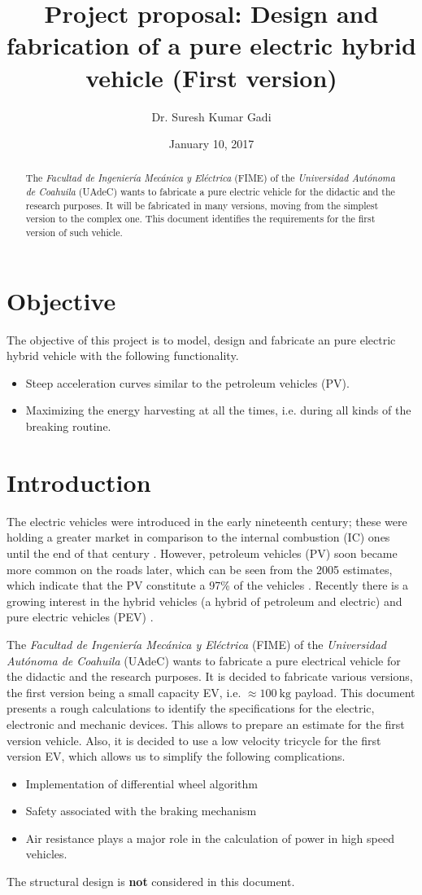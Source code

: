 \documentclass[journal]{IEEEtran}
\title{Project proposal: Design and fabrication of a pure electric hybrid vehicle (First version)}
\date {January 10, 2017}
\author{Dr. Suresh Kumar Gadi}
\begin{document}
\maketitle
\begin {abstract}
The \emph{Facultad de Ingeniería Mecánica y Eléctrica} (FIME) of the \emph{Universidad Autónoma de Coahuila} (UAdeC) wants to fabricate a pure electric vehicle for the didactic and the research purposes. It will be fabricated in many versions, moving from the simplest version to the complex one. This document identifies the requirements for the first version of such vehicle.
\end {abstract}
\section{Objective}
The objective of this project is to model, design and fabricate an pure electric hybrid vehicle with the following functionality.
\begin{itemize}
	\item Steep acceleration curves similar to the petroleum vehicles (PV).
	\item Maximizing the energy harvesting at all the times, i.e. during all kinds of the breaking routine.
\end{itemize}
\section{Introduction}
The electric vehicles were introduced in the early nineteenth century; these were holding a greater market in comparison to the internal combustion (IC) ones until the end of that century \cite{6487583}. However, petroleum vehicles (PV) soon became more common on the roads later, which can be seen from the 2005 estimates, which indicate that the PV constitute a 97\% of the vehicles \cite{de2012electrical}. Recently there is a growing interest in the hybrid vehicles (a hybrid of petroleum and electric) and pure electric vehicles (PEV) \cite{hori2004future, turrentine1995will, SKGadi-2016EuropeReportEV}.

The \emph{Facultad de Ingeniería Mecánica y Eléctrica} (FIME) of the \emph{Universidad Autónoma de Coahuila} (UAdeC) wants to fabricate a pure electrical vehicle for the didactic and the research purposes. It is decided to fabricate various versions, the first version being a small capacity EV, i.e. $\approx \SI{100}{\kilo\gram}$ payload. This document presents a rough calculations to identify the specifications for the electric, electronic and mechanic devices. This allows to prepare an estimate for the first version vehicle. Also, it is decided to use a low velocity tricycle for the first version EV, which allows us to simplify the following complications.
\begin{itemize}
  \item Implementation of  differential wheel algorithm
  \item Safety associated with the braking mechanism
  \item Air resistance plays a major role in the calculation of power in high speed vehicles.
\end{itemize}
The structural design is \textbf{not} considered in this document.
\end{document}

